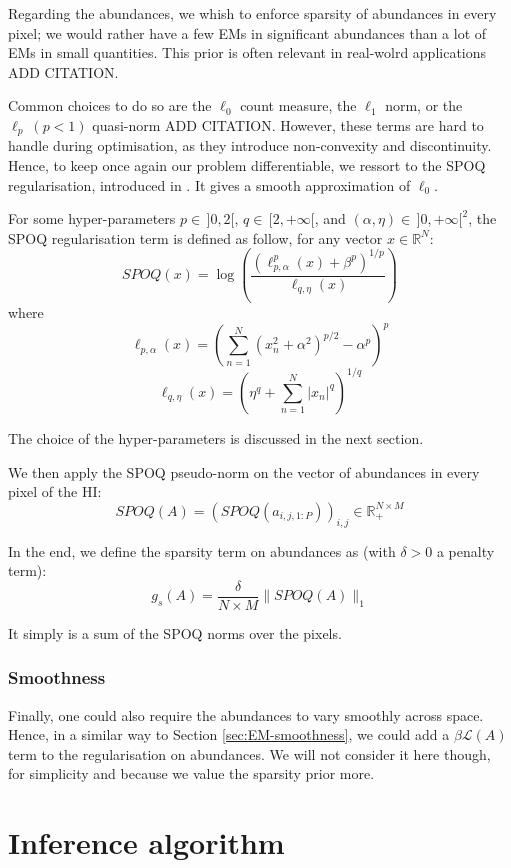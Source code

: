 \documentclass{article}
\begin{document}
Regarding the abundances, we whish to enforce sparsity of abundances in every pixel; we would rather have a few EMs in significant abundances than a lot of EMs in small quantities. This prior is often relevant in real-wolrd applications ADD CITATION.

Common choices to do so are the $\ell_0$ count measure, the $\ell_1$ norm, or the $\ell_p \ (p<1)$ quasi-norm ADD CITATION. However, these terms are hard to handle during optimisation, as they introduce non-convexity and discontinuity. Hence, to keep once again our problem differentiable, we ressort to the SPOQ regularisation, introduced in \citet{cherni_spoq_2020}. It gives a smooth approximation of $\ell_0$.

For some hyper-parameters $p\in \, ]0, 2[$, $q\in \, [2, +\infty[$, and $(\alpha, \eta) \in \, ]0, +\infty [^2$, the SPOQ regularisation term is defined as follow, for any vector $x \in \mathbb{R}^N$:
$$SPOQ(x) = \log \left( \frac{(\ell_{p,\alpha}^p (x) + \beta^p)^{1/p}}{\ell_{q,\eta} (x)} \right)$$
        where
        $$\ell_{p,\alpha} (x) = \left( \sum_{n=1}^N (x_n^2 + \alpha^2)^{p/2} - \alpha^p \right)^p$$
        $$\ell_{q,\eta} (x) = \left( \eta^q + \sum_{n=1}^N |x_n|^q \right)^{1/q}$$

The choice of the hyper-parameters is discussed in the next section.

We then apply the SPOQ pseudo-norm on the vector of abundances in every pixel of the HI:
$$SPOQ(A) = (SPOQ(a_{i,j,1:P}))_{i, j} \in \mathbb{R}_+^{N \times M}$$

In the end, we define the sparsity term on abundances as (with $\delta > 0$ a penalty term):
\begin{equation}\label{eq:g_s}
  g_s(A) = \frac{\delta}{N \times M} \| SPOQ(A) \|_{1}
\end{equation}

It simply is a sum of the SPOQ norms over the pixels.

\subsubsection{Smoothness}
Finally, one could also require the abundances to vary smoothly across space. Hence, in a similar way to Section \ref{sec:EM-smoothness}, we could add a $\beta \mathcal{L}(A)$ term to the regularisation on abundances. We will not consider it here though, for simplicity and because we value the sparsity prior more.


\section{Inference algorithm}
\end{document}
